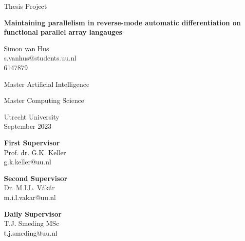 \documentclass[a4paper]{paper}
\renewcommand{\|}{\ |\ }
\begin{document}
    \begin{titlepage}
        \centering
        \vspace*{\fill}

        {\large Thesis Project\par}

        \vspace*{0.5cm}

        \begin{huge}
            \bfseries Maintaining parallelism in reverse-mode automatic differentiation on functional parallel array langauges
            
        \end{huge}

        \vspace*{0.5cm}

        \Large Simon van Hus\\
        \large s.vanhus@students.uu.nl\\
        \large 6147879\\

        \vspace*{0.5cm}
        
        {\Large Master Artificial Intelligence\par}
        {\Large Master Computing Science\par}
        {\large Utrecht University\\}
        {\large September 2023\\}

        \vspace*{0.5cm}
        
        \begin{normalsize}
            \textbf{First Supervisor}\\
            Prof. dr. G.K. Keller\\
            g.k.keller@uu.nl\par
            
            \textbf{Second Supervisor}\\
            Dr. M.I.L. Vákár\\
            m.i.l.vakar@uu.nl\par
            
            \textbf{Daily Supervisor}\\
            T.J. Smeding MSc\\
            t.j.smeding@uu.nl
        \end{normalsize}

        \vspace*{1cm}

        \vspace*{\fill}
    \end{titlepage}
\end{document}
